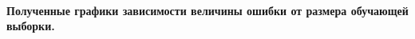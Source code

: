 \documentclass[12pt]{article}
\begin{document}
\paragraph{Полученные графики зависимости величины ошибки от размера обучающей выборки.}
\begin{center}
\end{center}
\end{document}
